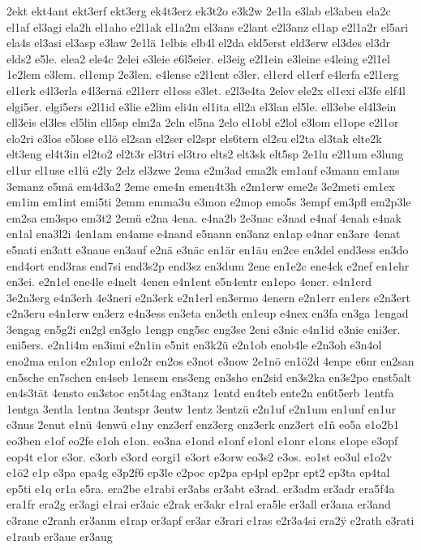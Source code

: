 {2ekt
ekt4ant
ekt3erf
ekt3erg
ek4t3erz
ek3t2o
e3k2w
2e1la
e3lab
el3aben
ela2c
el1af
el3agi
ela2h
el1aho
e2l1ak
el1a2m
el3ans
e2lant
e2l3anz
el1ap
e2l1a2r
el5ari
ela4s
el3asi
el3asp
e3law
2e1lä
1elbis
elb4l
el2da
eld5erst
eld3erw
el3des
el3dr
elds2
e5le.
elea2
ele4c
2elei
e3leie
e6l5eier.
el3eig
e2l1ein
e3leine
e4leing
e2l1el
1e2lem
e3lem.
el1emp
2e3len.
e4lense
e2l1ent
e3ler.
el1erd
el1erf
e4lerfa
e2l1erg
el1erk
e4l3erla
e4l3ernä
e2l1err
el1ess
e3let.
e2l3e4ta
2elev
ele2x
el1exi
el3fe
elf4l
elgi5er.
elgi5ers
e2l1id
e3lie
e2lim
eli4n
el1ita
ell2a
el3lan
el5le.
ell3ebe
el4l3ein
ell3eis
el3les
el5lin
ell5sp
elm2a
2eln
el5na
2elo
el1obl
e2lol
e3lom
el1ope
e2l1or
elo2ri
e3los
e5lose
e1lö
el2san
el2ser
el2spr
els6tern
el2su
el2ta
el3tak
elte2k
elt3eng
el4t3in
el2to2
el2t3r
el3tri
el3tro
elts2
elt3sk
elt5sp
2e1lu
e2l1um
e3lung
el1ur
el1use
e1lü
e2ly
2elz
el3zwe
2ema
e2m3ad
ema2k
em1anf
e3mann
em1ans
3emanz
e5mä
em4d3a2
2eme
eme4n
emen4t3h
e2m1erw
eme2s
3e2meti
em1ex
em1im
em1int
emi5ti
2emm
emma3u
e3mon
e2mop
emo5s
3empf
em3pfl
em2p3le
em2sa
em3spo
em3t2
2emü
e2na
4ena.
e4na2b
2e3nac
e3nad
e4naf
4enah
e4nak
en1al
ena3l2i
4en1am
en4ame
e4nand
e5nann
en3anz
en1ap
e4nar
en3are
4enat
e5nati
en3att
e3naue
en3auf
e2nä
e3näc
en1är
en1äu
en2ce
en3del
end3ess
en3do
end4ort
end3ras
end7si
end3s2p
end3sz
en3dum
2ene
en1e2c
ene4ck
e2nef
en1ehr
en3ei.
e2n1el
ene4le
e4nelt
4enen
e4n1ent
e5n4entr
en1epo
4ener.
e4n1erd
3e2n3erg
e4n3erh
4e3neri
e2n3erk
e2n1erl
en3ermo
4enern
e2n1err
en1ers
e2n3ert
e2n3eru
e4n1erw
en3erz
e4n3ess
en3eta
en3eth
en1eup
e4nex
en3fa
en3ga
1engad
3engag
en5g2i
en2gl
en3glo
1engp
eng5sc
eng3se
2eni
e3nic
e4n1id
e3nie
eni3er.
eni5ers.
e2n1i4m
en3imi
e2n1in
e5nit
en3k2ü
e2n1ob
enob4le
e2n3oh
e3n4ol
eno2ma
en1on
e2n1op
en1o2r
en2os
e3not
e3now
2e1nö
en1ö2d
4enpe
e6nr
en2san
en5sche
en7schen
en4seb
1ensem
ens3eng
en3sho
en2sid
en3s2ka
en3s2po
enst5alt
en4s3tät
4ensto
en3stoc
en5t4ag
en3tanz
1entd
en4teb
ente2n
en6t5erb
1entfa
1entga
3entla
1entna
3entspr
3entw
1entz
3entzü
e2n1uf
e2n1um
en1unf
en1ur
e3nus
2enut
e1nü
4enwü
e1ny
enz3erf
enz3erg
enz3erk
enz3ert
e1ñ
eo5a
e1o2b1
eo3ben
e1of
eo2fe
e1oh
e1on.
eo3na
e1ond
e1onf
e1onl
e1onr
e1ons
e1ope
e3opf
eop4t
e1or
e3or.
e3orb
e3ord
eorgi1
e3ort
e3orw
eo3s2
e3os.
eo1st
eo3ul
e1o2v
e1ö2
e1p
e3pa
epa4g
e3p2f6
ep3le
e2poc
ep2pa
ep4pl
ep2pr
ept2
ep3ta
ep4tal
ep5ti
e1q
er1a
e5ra.
era2be
e1rabi
er3abs
er3abt
e3rad.
er3adm
er3adr
era5f4a
era1fr
era2g
er3agi
e1rai
er3aic
e2rak
er3akr
e1ral
era5le
er3all
er3ana
er3and
e3rane
e2ranh
er3anm
e1rap
er3apf
er3ar
e3rari
e1ras
e2r3a4si
era2^^ff
e2rath
e3rati
e1raub
er3aue
er3aug
}
